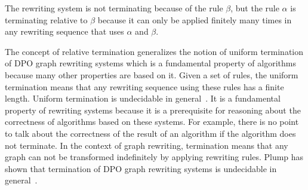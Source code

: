 \begin{example}
\begin{center}
{
                }
            \end{center}  
    The rewriting system is not terminating because of the rule $\beta$, but the rule $\alpha$ is terminating relative to $\beta$ because it can only be applied finitely many times in any rewriting sequence that uses $\alpha$ and $\beta$.
\end{example}
The concept of relative termination generalizes the notion of uniform termination of DPO graph rewriting systems which is a fundamental property of algorithms because many other properties are based on it. Given a set of rules, the uniform termination means that any rewriting sequence using these rules has a finite length. Uniform termination is undecidable in general~\cite{plump1998terminationundecidable}. It is a fundamental property of rewriting systems because it is a prerequisite for reasoning about the correctness of algorithms based on these systems.
For example, there is no point to talk about the correctness of the result of an algorithm if the algorithm does not terminate. In the context of graph rewriting, termination means that any graph can not be transformed indefinitely by applying rewriting rules. Plump has shown that termination of DPO graph rewriting systems is undecidable in general~\cite{plump1998terminationundecidable}.